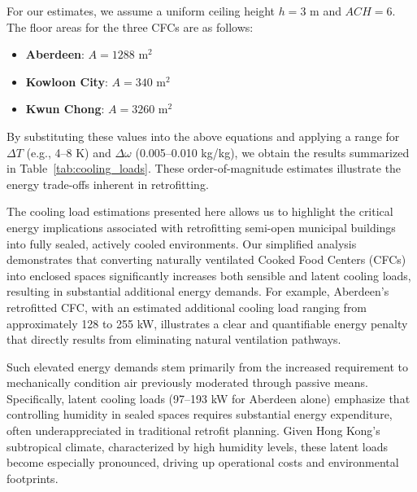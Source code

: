 \documentclass[preprint,12pt]{elsarticle}
\begin{document}
For our estimates, we assume a uniform ceiling height $h = 3$ m and $ACH = 6$. The floor areas for the three CFCs are as follows:
\begin{itemize}
    \item \textbf{Aberdeen}: $A = 1288$ m$^2$
    \item \textbf{Kowloon City}: $A = 340$ m$^2$
    \item \textbf{Kwun Chong}: $A = 3260$ m$^2$
\end{itemize}

By substituting these values into the above equations and applying a range for $\Delta T$ (e.g., 4--8 K) and $\Delta \omega$ (0.005--0.010 kg/kg), we obtain the results summarized in Table~\ref{tab:cooling_loads}. These order-of-magnitude estimates illustrate the energy trade-offs inherent in retrofitting.

\begin{table}[htbp]
\centering
\caption{Estimated Additional Cooling Loads for Retrofitted CFCs.}
\label{tab:cooling_loads}
\end{table}

The cooling load estimations presented here allows us to highlight the critical energy implications associated with retrofitting semi-open municipal buildings into fully sealed, actively cooled environments. Our simplified analysis demonstrates that converting naturally ventilated Cooked Food Centers (CFCs) into enclosed spaces significantly increases both sensible and latent cooling loads, resulting in substantial additional energy demands. For example, Aberdeen's retrofitted CFC, with an estimated additional cooling load ranging from approximately 128 to 255 kW, illustrates a clear and quantifiable energy penalty that directly results from eliminating natural ventilation pathways.

Such elevated energy demands stem primarily from the increased requirement to mechanically condition air previously moderated through passive means. Specifically, latent cooling loads (97–193 kW for Aberdeen alone) emphasize that controlling humidity in sealed spaces requires substantial energy expenditure, often underappreciated in traditional retrofit planning. Given Hong Kong’s subtropical climate, characterized by high humidity levels, these latent loads become especially pronounced, driving up operational costs and environmental footprints.
\end{document}
